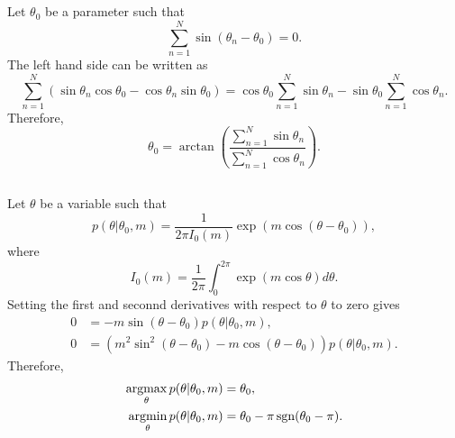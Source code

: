 \subsection{}
\label{2.53}
Let $\theta_0$  be a parameter such that
%
\begin{equation}
\sum_{n = 1}^{N}
\sin (\theta_n - \theta_0)
=
0.
\end{equation}
%
The left hand side can be written as
%
\begin{equation}
\sum_{n = 1}^{N}
(
\sin \theta_n 
\cos \theta_0 
-
\cos \theta_n 
\sin \theta_0
)
=
\cos \theta_0
\sum_{n = 1}^{N}
\sin \theta_n
-
\sin \theta_0
\sum_{n = 1}^{N}
\cos \theta_n.
\end{equation}
%
Therefore,
%
\begin{equation}
\theta_0
=
\arctan 
\left(
	\frac
	{\sum_{n = 1}^{N} \sin \theta_n}
	{\sum_{n = 1}^{N} \cos \theta_n}
\right).
\end{equation}
%


\subsection{}
\label{2.54}
Let $\theta$ be a variable such that 
%
\begin{equation}
p(\theta | \theta_0, m)
=
\frac{1}{2 \pi I_0 (m)}
\exp
\left(
	m 
	\cos (\theta - \theta_0)
\right),
\end{equation}
%
where
%
\begin{equation}
I_0(m)
=
\frac{1}{2 \pi}
\int_{0}^{2 \pi}
\exp(m \cos \theta) 
d\theta.
\end{equation}
%
Setting the first and seconnd derivatives with respect to $\theta$ to zero gives
%
\begin{equation}
\begin{aligned}
0
&=
-
m
\sin (\theta - \theta_0)
p(\theta | \theta_0, m), 
\\
0
&=
\left(
	m ^ 2
	\sin ^ 2 (\theta - \theta_0)
	-
	m 
	\cos (\theta - \theta_0)
\right)
p(\theta | \theta_0, m).
\end{aligned}
\end{equation}
%
Therefore,
%
\begin{equation}
\begin{aligned}
\operatorname*{arg max}_\theta p(\theta | \theta_0, m)
&=
\theta_0, 
\\
\operatorname*{arg min}_\theta p(\theta | \theta_0, m)
&=
\theta_0 
- 
\pi 
\operatorname{sgn} (\theta_0 - \pi).
\end{aligned}
\end{equation}
%


